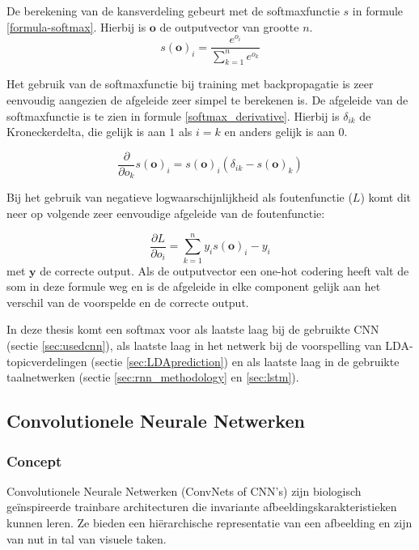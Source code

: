 De berekening van de kansverdeling gebeurt met de softmaxfunctie $s$ in formule \eqref{formula-softmax}. Hierbij is $\mathbf{o}$ de outputvector van grootte $n$.
\begin{equation}
s(\textbf{o})_i = \frac{e^{o_i}}{\sum^{n}_{k=1}{e^{o_k}}}
\label{formula-softmax}
\end{equation}

Het gebruik van de softmaxfunctie bij training met backpropagatie is zeer eenvoudig aangezien de afgeleide zeer simpel te berekenen is. De afgeleide van de softmaxfunctie is te zien in formule \eqref{softmax_derivative}. Hierbij is $\delta_{ik}$ de Kroneckerdelta, die gelijk is aan $1$ als $i = k$ en anders gelijk is aan $0$.

\begin{equation}
    \frac{\partial}{\partial o_k}s(\textbf{o})_i =  s(\textbf{o})_i(\delta_{ik} - s(\textbf{o})_k)
    \label{softmax_derivative}
\end{equation}

Bij het gebruik van negatieve logwaarschijnlijkheid als foutenfunctie ($L$) komt dit neer op volgende zeer eenvoudige afgeleide van de foutenfunctie:

\begin{equation}
    \frac{\partial L}{\partial o_i} = \sum_{k=1}^n{y_i}s(\textbf{o})_i - y_i
\end{equation}
met $\textbf{y}$ de correcte output. Als de outputvector een one-hot codering heeft valt de som in deze formule weg en is de afgeleide in elke component gelijk aan het verschil van de voorspelde en de correcte output\cite{Bishop:1995:NNP:525960}. 

In deze thesis komt een softmax voor als laatste laag bij de gebruikte CNN (sectie \ref{sec:usedcnn}), als laatste laag in het netwerk bij de voorspelling van LDA-topicverdelingen (sectie \ref{sec:LDAprediction}) en als laatste laag in de gebruikte taalnetwerken (sectie \ref{sec:rnn_methodology} en \ref{sec:lstm}).

\subsection{Convolutionele Neurale Netwerken}
\label{sec:CNN}
\subsubsection{Concept}
Convolutionele Neurale Netwerken (ConvNets of CNN's) zijn biologisch ge\" inspireerde trainbare architecturen die invariante afbeeldingskarakteristieken kunnen leren\cite{LeCun2010}. Ze bieden een hi\"erarchische representatie van een afbeelding en zijn van nut in tal van visuele taken\cite{Ciresan2012,Girshick2014,Zhou2015}.

